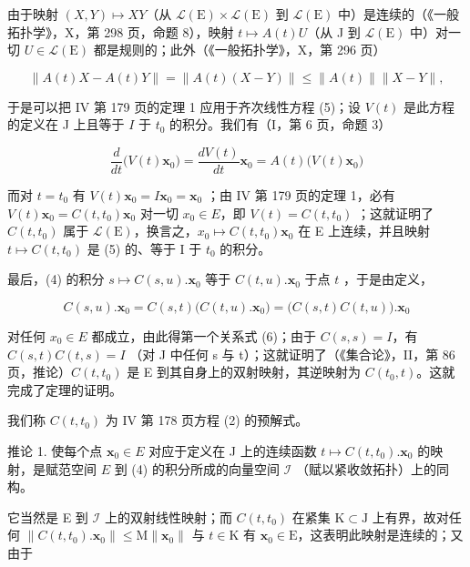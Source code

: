 由于映射 \((X, Y) \mapsto XY\)（从 \(\mathcal{L}(\mathrm{E}) \times \mathcal{L}(\mathrm{E})\) 到 \(\mathcal{L}(\mathrm{E})\) 中）是连续的（《一般拓扑学》，X，第 298 页，命题 8），映射 \(t \mapsto A(t)U\)（从 J 到 \(\mathcal{L}(\mathrm{E})\) 中）对一切 \(U \in \mathcal{L}(\mathrm{E})\) 都是规则的；此外（《一般拓扑学》，X，第 296 页）

\[
\| A (t) X - A (t) Y \| = \| A (t) (X - Y) \| \leqslant \| A (t) \| \| X - Y \|,
\]

于是可以把 IV 第 179 页的定理 1 应用于齐次线性方程 (5)；设 \(V(t)\) 是此方程的定义在 J 上且等于 \(I\) 于 \(t_0\) 的积分。我们有（I，第 6 页，命题 3）

\[
\frac {d}{d t} \big (V (t) \mathbf {x} _ {0} \big) = \frac {d V (t)}{d t} \mathbf {x} _ {0} = A (t) \big (V (t) \mathbf {x} _ {0} \big)
\]

而对 \(t = t_{0}\) 有 \(V(t)\mathbf{x}_{0} = I\mathbf{x}_{0} = \mathbf{x}_{0}\) ；由 IV 第 179 页的定理 1，必有 \(V(t)\mathbf{x}_{0} = C(t, t_{0})\mathbf{x}_{0}\) 对一切 \(x_{0} \in E\)，即 \(V(t) = C(t, t_{0})\) ；这就证明了 \(C(t, t_{0})\) 属于 \(\mathcal{L}(\mathrm{E})\)，换言之，\(x_{0} \mapsto C(t, t_{0})\mathbf{x}_{0}\) 在 E 上连续，并且映射 \(t \mapsto C(t, t_{0})\) 是 (5) 的、等于 I 于 \(t_{0}\) 的积分。

最后，(4) 的积分 \(s \mapsto C(s, u). \mathbf{x}_0\) 等于 \(C(t, u). \mathbf{x}_0\) 于点 \(t\) ，于是由定义，

\[
C (s, u). \mathbf {x} _ {0} = C (s, t) \bigl (C (t, u). \mathbf {x} _ {0} \bigr) = \bigl (C (s, t)   C (t, u) \bigr). \mathbf {x} _ {0}
\]

对任何 \(x_{0} \in E\) 都成立，由此得第一个关系式 (6)；由于 \(C(s, s) = I\)，有 \(C(s, t)C(t, s) = I\) （对 J 中任何 s 与 t）；这就证明了（《集合论》，II，第 86 页，推论）\(C(t, t_{0})\) 是 E 到其自身上的双射映射，其逆映射为 \(C(t_{0}, t)\)。这就完成了定理的证明。

我们称 \(C(t, t_0)\) 为 IV 第 178 页方程 (2) 的预解式。

推论 1. 使每个点 \(\mathbf{x}_0 \in E\) 对应于定义在 J 上的连续函数 \(t \mapsto C(t, t_0). \mathbf{x}_0\) 的映射，是赋范空间 \(E\) 到 (4) 的积分所成的向量空间 \(\mathcal{I}\) （赋以紧收敛拓扑）上的同构。

它当然是 E 到 \(\mathcal{I}\) 上的双射线性映射；而 \(C(t, t_0)\) 在紧集 \(\mathrm{K} \subset \mathrm{J}\) 上有界，故对任何 \(\|C(t, t_0). \mathbf{x}_0\| \leqslant \mathrm{M} \| \mathbf{x}_0\|\) 与 \(t \in \mathrm{K}\) 有 \(\mathbf{x}_0 \in \mathrm{E}\)，这表明此映射是连续的；又由于

